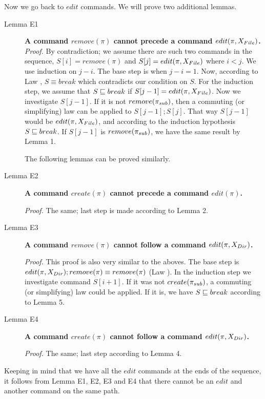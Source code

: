 Now we go back to \(edit\) commands. We will prove two additional lemmas.
\begin{description}
\item[Lemma E1] {\bf A command \(remove(\pi)\) cannot precede a command
\(edit(\pi,X_{File})\).} \emph{Proof.} 
By contradiction; we assume there are such two commands in the sequence,
\(S[i]=remove(\pi)\) and \(S[j]=edit(\pi,X_{File})\) where \(i<j\). We
use induction on \(j-i\). The base
step is when \(j-i=1\). Now, according to Law \lawxviii, \(S\equiv
break\) which contradicts our condition on \(S\).
For the induction step, we assume that \(S\sqsubseteq break\) if
\(S[j-1]=edit(\pi,X_{File})\). Now we investigate \(S[j-1]\). If it is
not \(remove(\pi_{sub})\), then a commuting (or simplifying) law can be
applied to \(S[j-1];S[j]\). That way
\(S[j-1]\) would be \(edit(\pi,X_{File})\), and according to the
induction hypothesis \(S\sqsubseteq break\). If \(S[j-1]\) is
\(remove(\pi_{sub})\), we have the same result by Lemma 1.

\begin{forrsi}
The following lemmas can be proved similarly.
\end{forrsi}
\item[Lemma E2] {\bf A command \(create(\pi)\) cannot precede a command 
\(edit(\pi)\).} 
\begin{notrsi}
\emph{Proof.} The same; last step is made according to
Lemma 2.
\end{notrsi}

\item[Lemma E3] {\bf A command \(remove(\pi)\) cannot follow a
command \(edit(\pi,X_{Dir})\).} 
\begin{notrsi}
\emph{Proof.} 
This proof is also very similar to the aboves. The base step is 
\(edit(\pi,X_{Dir}); remove(\pi)\equiv remove(\pi)\) (Law \lawxxv). In the
induction step we investigate command \(S[i+1]\). If it was not
\(create(\pi_{sub})\), a commuting (or simplifying) law could be applied. If
it is, we have \(S\sqsubseteq break\) according to Lemma 5.
\end{notrsi}

\item[Lemma E4] {\bf A command \(create(\pi)\) cannot follow a
command \(edit(\pi,X_{Dir})\).} 
\begin{notrsi}
\emph{Proof.} The same; last step
according to Lemma 4.
\end{notrsi}
\end{description}

\noindent
Keeping in mind that we have all the \(edit\) commands at the ends of the
sequence, it follows from Lemma E1, E2, E3 and E4 that there cannot be an
\(edit\) and another command on the same path.


